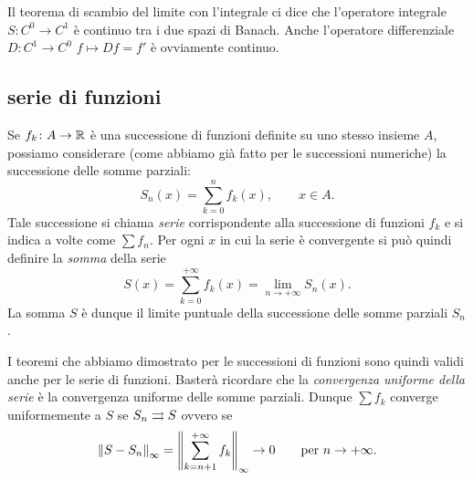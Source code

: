Il teorema di scambio del limite con l'integrale ci dice che
l'operatore integrale $S\colon C^0 \to C^1$ è continuo tra i due spazi di Banach. Anche l'operatore differenziale $D\colon C^1 \to C^0$ $f\mapsto Df = f'$ è ovviamente continuo.

\subsection{serie di funzioni}

Se $f_k\colon A \to {\mathbb R}$ è una successione di funzioni
definite su uno stesso insieme $A$, possiamo considerare (come abbiamo già fatto per le successioni numeriche) la successione delle somme parziali:
\[
  S_n(x) = \sum_{k=0}^n f_k(x), \qquad x\in A.
\]
Tale successione si chiama \emph{serie} corrispondente alla successione di funzioni $f_k$
e si indica a volte come $\sum f_n$. Per ogni $x$ in cui la serie è convergente si può quindi definire la
\emph{somma}%
 della serie
\[
  S(x) = \sum_{k=0}^{+\infty} f_k(x) = \lim_{n\to +\infty} S_n(x).
\]
La somma $S$ è dunque il limite puntuale della successione delle somme parziali $S_n$.

I teoremi che abbiamo dimostrato per le successioni di funzioni sono quindi validi anche per le serie di funzioni. Basterà ricordare che la \emph{convergenza uniforme della serie}
%
%
%
 è la convergenza uniforme delle somme parziali. Dunque $\sum f_k$ converge uniformemente a $S$ se $S_n \rightrightarrows S$ ovvero se
\[
  {\left\Vert S - S_n\right\Vert}_\infty = {\left\Vert \sum_{k=n+1}^{+\infty} f_k\right\Vert}_\infty \to 0
  \qquad \text{per $n\to +\infty$.}
\]



